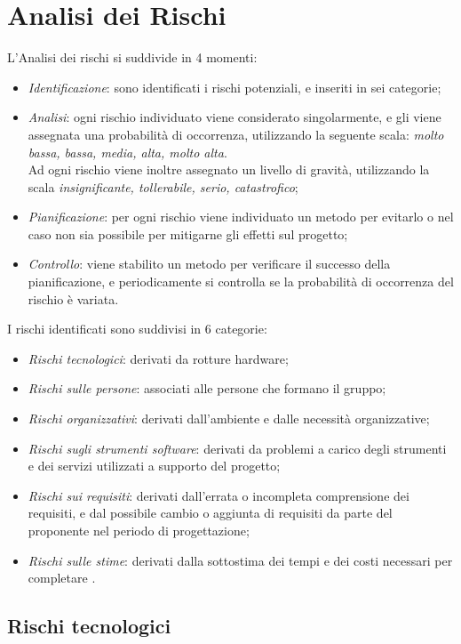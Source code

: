 \section{Analisi dei Rischi}
L'Analisi dei rischi si suddivide in 4 momenti:
\begin{itemize}
\item \textit{Identificazione}: sono identificati i rischi potenziali, e inseriti in sei categorie;
\item \textit{Analisi}: ogni rischio individuato viene considerato singolarmente, e gli viene assegnata una probabilità di occorrenza, utilizzando la seguente scala: \textit{molto bassa, bassa, media, alta, molto alta}. \\
Ad ogni rischio viene inoltre assegnato un livello di gravità, utilizzando la scala \textit{insignificante, tollerabile, serio, catastrofico};
\item \textit{Pianificazione}: per ogni rischio viene individuato un metodo per evitarlo o nel caso non sia possibile per mitigarne gli effetti sul progetto;
\item \textit{Controllo}: viene stabilito un metodo per verificare il successo della pianificazione, e periodicamente si controlla se la probabilità di occorrenza del rischio è variata.
\end{itemize}

I rischi identificati sono suddivisi in 6 categorie:
\begin{itemize}
\item \textit{Rischi tecnologici}: derivati da rotture hardware;
\item \textit{Rischi sulle persone}: associati alle persone che formano il gruppo;
\item \textit{Rischi organizzativi}: derivati dall'ambiente e dalle necessità organizzative;
\item \textit{Rischi sugli strumenti software}: derivati da problemi a carico degli strumenti e dei servizi utilizzati a supporto del progetto;
\item \textit{Rischi sui requisiti}: derivati dall'errata o incompleta comprensione dei requisiti, e dal possibile cambio o aggiunta di requisiti da parte del proponente nel periodo di progettazione;
\item \textit{Rischi sulle stime}: derivati dalla sottostima dei tempi e dei costi necessari per completare \ProjectName{}.
\end{itemize}

	\subsection{Rischi tecnologici}
	

